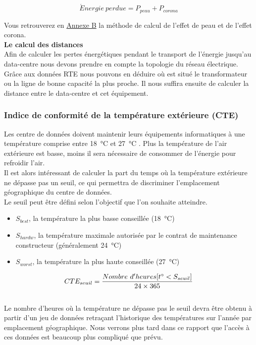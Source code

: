 \[\acute{E}nergie\ perdue = P_{peau} + P_{corona}\]

Vous retrouverez en \hyperref[appendix:aclosses]{Annexe B} la méthode de calcul de l'effet de peau et de l'effet corona.\\

\textbf{Le calcul des distances}\\
Afin de calculer les pertes énergétiques pendant le transport de l'énergie jusqu'au data-centre nous devons prendre en compte la topologie du réseau électrique. Grâce aux données RTE \cite{RTEData} nous pouvons en déduire où est situé le transformateur ou la ligne de bonne capacité la plus proche. Il nous suffira ensuite de calculer la distance entre le data-centre et cet équipement.

\subsubsection{Indice de conformité de la température extérieure (CTE)}
Les centre de données doivent maintenir leurs équipements informatiques à une température comprise entre \SI{18}{\degreeCelsius} et \SI{27}{\degreeCelsius} \cite{ASHRAEguidlines}. Plus la température de l'air extérieure est basse, moins il sera nécessaire de consommer de l'énergie pour refroidir l'air.\\

Il est alors intéressant de calculer la part du temps où la température extérieure ne dépasse pas un seuil, ce qui permettra de discriminer l'emplacement géographique du centre de données.\\Le seuil peut être défini selon l'objectif que l'on souhaite atteindre.
\begin{itemize}
	\item $S_{best}$, la température la plus basse conseillée (\SI{18}{\degreeCelsius})
	\item $S_{hardw}$, la température maximale autorisée par le contrat de maintenance constructeur (généralement \SI{24}{\degreeCelsius})
	\item $S_{worst}$, la température la plus haute conseillée (\SI{27}{\degreeCelsius})
\end{itemize}

\[CTE_{seuil} = \frac{Nombre\ d'heures[t\degree < S_{seuil}]}{24 \times 365}\]\\
Le nombre d'heures où la température ne dépasse pas le seuil devra être obtenu à partir d'un jeu de données retraçant l'historique des températures sur l'année par emplacement géographique. Nous verrons plus tard dans ce rapport que l'accès à ces données est beaucoup plus compliqué que prévu.

